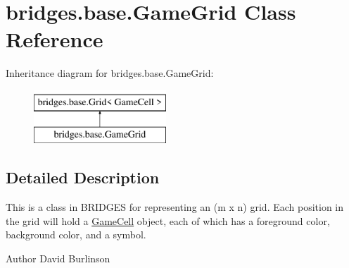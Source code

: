\hypertarget{classbridges_1_1base_1_1_game_grid}{}\section{bridges.\+base.\+Game\+Grid Class Reference}
\label{classbridges_1_1base_1_1_game_grid}
Inheritance diagram for bridges.\+base.\+Game\+Grid\+:\begin{figure}[H]
\begin{center}
\leavevmode
\includegraphics[height=2.000000cm]{classbridges_1_1base_1_1_game_grid}
\end{center}
\end{figure}


\subsection{Detailed Description}
This is a class in B\+R\+I\+D\+G\+ES for representing an (m x n) grid. Each position in the grid will hold a \hyperlink{classbridges_1_1base_1_1_game_cell}{Game\+Cell} object, each of which has a foreground color, background color, and a symbol. 

\begin{DoxyAuthor}{Author}
David Burlinson 
\end{DoxyAuthor}
